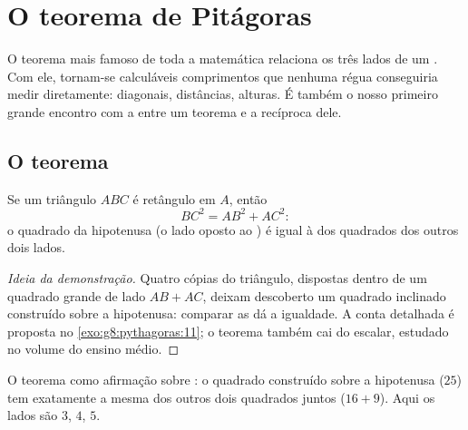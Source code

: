 \chapter{O teorema de Pitágoras}\label{ch:g8:pythagoras}

O teorema mais famoso de toda a matemática relaciona os três lados de
um . Com ele, tornam-se calculáveis comprimentos que
nenhuma régua conseguiria medir diretamente: diagonais, distâncias,
alturas. É também o nosso primeiro grande encontro com a 
entre um teorema e a recíproca dele.

\section{O teorema}

\begin{theorem}[Pitágoras]\label{thm:g8:pythagoras:direct}
Se um triângulo $ABC$ é retângulo em $A$, então
\[
BC^2 = AB^2 + AC^2 :
\]
o quadrado da hipotenusa (o lado oposto ao ) é igual à 
dos quadrados dos outros dois lados.
\end{theorem}

\begin{proof}[Ideia da demonstração]
Quatro cópias do triângulo, dispostas dentro de um quadrado grande de
lado $AB + AC$, deixam descoberto um quadrado inclinado construído
sobre a hipotenusa: comparar as  dá a igualdade. A conta detalhada
é proposta no \cref{exo:g8:pythagoras:11}; o teorema também cai do
 escalar, estudado no volume do ensino médio.
\end{proof}

\begin{omfigure}

{\small O teorema como afirmação sobre : o quadrado construído
sobre a hipotenusa ($25$) tem exatamente a mesma  dos outros dois
quadrados juntos ($16 + 9$). Aqui os lados são $3$, $4$, $5$.}
\end{omfigure}


